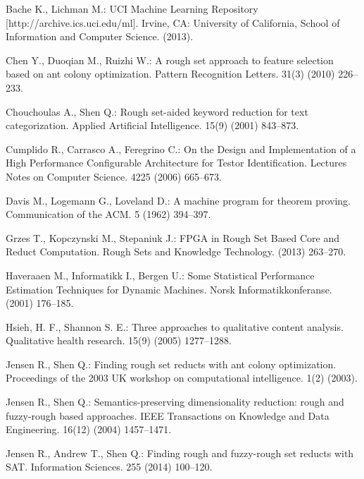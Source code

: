\documentclass[11pt]{article}   %
\begin{document}
\begin{thebibliography}{}

	Bache K., Lichman M.:  
	UCI Machine Learning Repository [http://archive.ics.uci.edu/ml]. 
	Irvine, CA: University of California, School of Information and Computer Science. (2013).
	
	Chen Y., Duoqian M., Ruizhi W.:
	A rough set approach to feature selection based on ant colony optimization.
	Pattern Recognition Letters. 31(3) (2010) 226--233.

	Chouchoulas A., Shen Q.:
	Rough set-aided keyword reduction for text categorization.
	Applied Artificial Intelligence. 15(9) (2001) 843--873.
	
	Cumplido R., Carrasco A., Feregrino C.:
	On the Design and Implementation of a High Performance Configurable Architecture for Testor Identification.
	Lectures Notes on Computer Science. 4225 (2006) 665--673.
	
	Davis M., Logemann G., Loveland D.:
	A machine program for theorem proving.
	Communication of the ACM. 5 (1962) 394--397.

	Grzes T., Kopczynski M., Stepaniuk J.:
	FPGA in Rough Set Based Core and Reduct Computation. 
	Rough Sets and Knowledge Technology.	(2013) 263--270.

	Haveraaen M., Informatikk I.,  Bergen U.:
	Some Statistical Performance Estimation Techniques for Dynamic Machines. 
	Norsk Informatikkonferanse. (2001) 176--185.

	Hsieh, H. F., Shannon S. E.:
	Three approaches to qualitative content analysis.
	Qualitative health research. 15(9) (2005) 1277--1288.
	
	Jensen R., Shen Q.:
	Finding rough set reducts with ant colony optimization.
	Proceedings of the 2003 UK workshop on computational intelligence. 1(2) (2003).

	Jensen R., Shen Q.:
	Semantics-preserving dimensionality reduction: rough and fuzzy-rough based approaches.
	IEEE Transactions on Knowledge and Data Engineering. 16(12) (2004) 1457--1471.
	
	Jensen R., Andrew T., Shen Q.:
	Finding rough and fuzzy-rough set reducts with SAT.
	Information Sciences. 255 (2014) 100--120.
	

\end{thebibliography}
\end{document}
